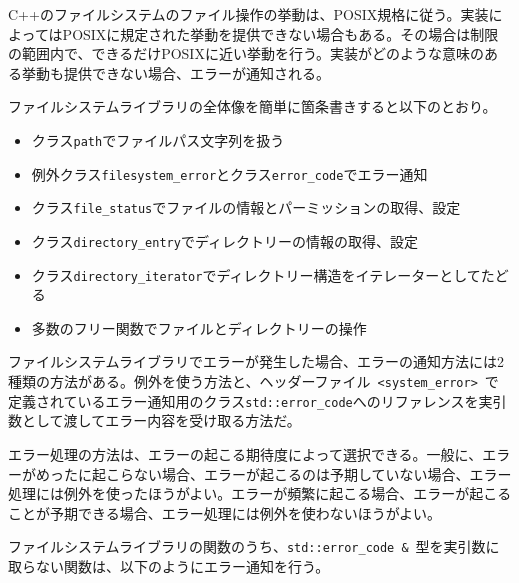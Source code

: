 %

C++のファイルシステムのファイル操作の挙動は、POSIX規格に従う。実装によってはPOSIXに規定された挙動を提供できない場合もある。その場合は制限の範囲内で、できるだけPOSIXに近い挙動を行う。実装がどのような意味のある挙動も提供できない場合、エラーが通知される。

%

ファイルシステムライブラリの全体像を簡単に箇条書きすると以下のとおり。

\begin{itemize}
\itemsep1pt\parskip0pt
\item
  クラス\lstinline!path!でファイルパス文字列を扱う
\item
  例外クラス\lstinline!filesystem_error!とクラス\lstinline!error_code!でエラー通知
\item
  クラス\lstinline!file_status!でファイルの情報とパーミッションの取得、設定
\item
  クラス\lstinline!directory_entry!でディレクトリーの情報の取得、設定
\item
  クラス\lstinline!directory_iterator!でディレクトリー構造をイテレーターとしてたどる
\item
  多数のフリー関数でファイルとディレクトリーの操作
\end{itemize}

%

ファイルシステムライブラリでエラーが発生した場合、エラーの通知方法には2種類の方法がある。例外を使う方法と、ヘッダーファイル~\lstinline!<system_error>!~で定義されているエラー通知用のクラス\lstinline!std::error_code!へのリファレンスを実引数として渡してエラー内容を受け取る方法だ。

エラー処理の方法は、エラーの起こる期待度によって選択できる。一般に、エラーがめったに起こらない場合、エラーが起こるのは予期していない場合、エラー処理には例外を使ったほうがよい。エラーが頻繁に起こる場合、エラーが起こることが予期できる場合、エラー処理には例外を使わないほうがよい。

%

ファイルシステムライブラリの関数のうち、\lstinline!std::error_code &!~型を実引数に取らない関数は、以下のようにエラー通知を行う。

